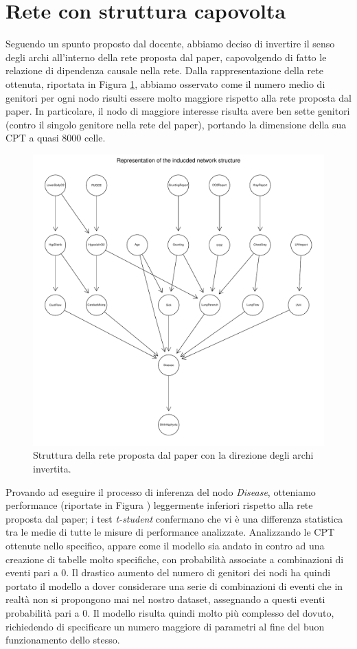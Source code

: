 \section{Rete con struttura capovolta}
Seguendo un spunto proposto dal docente, abbiamo deciso di invertire il senso degli archi all'interno della rete proposta dal paper, capovolgendo di fatto le relazione di dipendenza causale nella rete. Dalla rappresentazione della rete ottenuta, riportata in Figura \ref{fig:reversedstructure}, abbiamo osservato come il numero medio di genitori per ogni nodo risulti essere molto maggiore rispetto alla rete proposta dal paper. In particolare, il nodo di maggiore interesse risulta avere ben sette genitori (contro il singolo genitore nella rete del paper), portando la dimensione della sua CPT a quasi $8000$ celle. 
\begin{figure}
	\centering
	\includegraphics[width=1\linewidth]{images/reversed_structure}
	\caption{Struttura della rete proposta dal paper con la direzione degli archi invertita.}
	\label{fig:reversedstructure}
\end{figure}
Provando ad eseguire il processo di inferenza del nodo \textit{Disease}, otteniamo performance (riportate in Figura ) leggermente inferiori rispetto alla rete proposta dal paper; i test \textit{t-student} confermano che vi è una differenza statistica tra le medie di tutte le misure di performance analizzate. Analizzando le CPT ottenute nello specifico, appare come il modello sia andato in contro ad una creazione di tabelle molto specifiche, con probabilità associate a combinazioni di eventi pari a 0. Il drastico aumento del numero di genitori dei nodi ha quindi portato il modello a dover considerare una serie di combinazioni di eventi che in realtà non si propongono mai nel nostro dataset, assegnando a questi eventi probabilità pari a $0$. Il modello risulta quindi molto più complesso del dovuto, richiedendo di specificare un numero maggiore di parametri al fine del buon funzionamento dello stesso.
